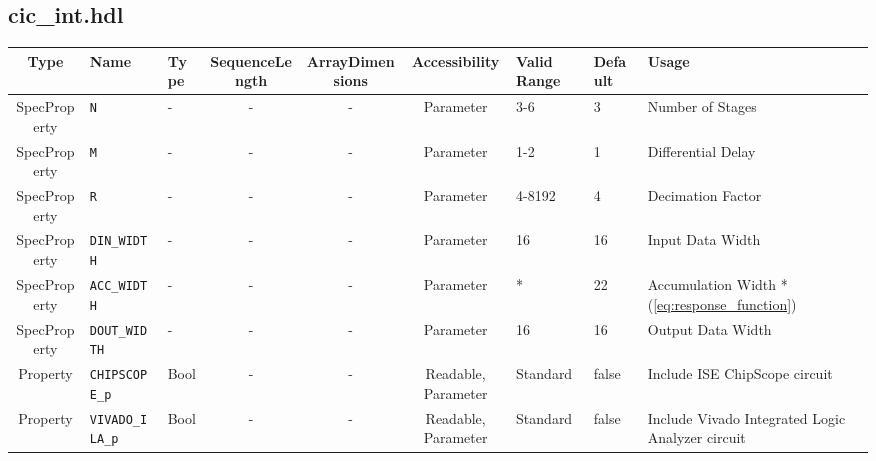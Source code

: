 \documentclass{article}
\def\comp{cic\_int}
\begin{document}
\begin{landscape}
	\subsection*{\comp.hdl}
	\begin{scriptsize}
		\begin{tabular}{|c|p{2cm}|p{1cm}|c|c|c|p{2cm}|p{1cm}|p{5cm}|}
			\hline
			\rowcolor{blue}
			Type         & Name              & Type & SequenceLength & ArrayDimensions & Accessibility & Valid Range & Default & Usage                                            \\
			\hline
			SpecProperty & \verb+N+          & -    & -              & -               & Parameter     & 3-6         & 3       & Number of Stages                                 \\
			\hline
			SpecProperty & \verb+M+          & -    & -              & -               & Parameter     & 1-2         & 1       & Differential Delay                               \\
			\hline
			SpecProperty & \verb+R+          & -    & -              & -               & Parameter     & 4-8192      & 4       & Decimation Factor                                \\
			\hline
			SpecProperty & \verb+DIN_WIDTH+  & -    & -              & -               & Parameter     & 16          & 16      & Input Data Width                                 \\
			\hline
			SpecProperty & \verb+ACC_WIDTH+  & -    & -              & -               & Parameter     & *           & 22      & Accumulation Width *(\ref{eq:response_function}) \\
			\hline
			SpecProperty & \verb+DOUT_WIDTH+  & -    & -              & -               & Parameter           & 16          & 16      & Output Data Width                                \\
			\hline
			Property     & \verb+CHIPSCOPE_p+ & Bool & -              & -               & Readable, Parameter & Standard    & false   & Include ISE ChipScope circuit                        \\
			\hline
			Property     & \verb+VIVADO_ILA_p+ & Bool & -              & -               & Readable, Parameter & Standard    & false   & Include Vivado Integrated Logic Analyzer circuit                        \\
			\hline
		\end{tabular}
	\end{scriptsize}


\end{landscape}
\end{document}
